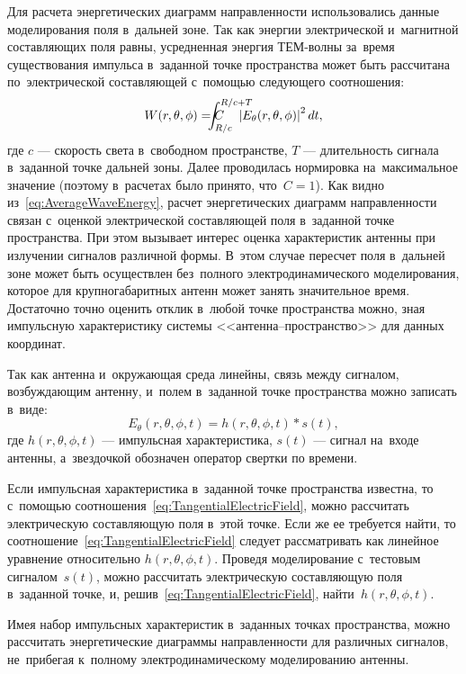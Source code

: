 Для расчета энергетических диаграмм направленности использовались данные
моделирования поля в~дальней зоне. Так как энергии электрической и~магнитной
составляющих поля равны, усредненная энергия ТЕМ-волны за~время существования
импульса в~заданной точке пространства может быть рассчитана по~электрической
составляющей с~помощью следующего соотношения:
\begin{equation}
    \label{eq:AverageWaveEnergy}
    W(r,\theta,\phi) = C\hanglimitsoperator{\int}{R/c+T}{R/c}
    \left| E_\theta(r,\theta,\phi) \right|^2 dt,
\end{equation}
где $c$ --- скорость света в~свободном пространстве, $T$ --- длительность
сигнала в~заданной точке дальней зоны. Далее проводилась нормировка на~максимальное значение
(поэтому в~расчетах было принято, что~$C=1$). Как видно
из~\eqref{eq:AverageWaveEnergy}, расчет энергетических диаграмм направленности
связан с~оценкой электрической составляющей поля в~заданной точке пространства.
При этом вызывает интерес оценка характеристик антенны при излучении сигналов
различной формы. В~этом случае пересчет поля в~дальней зоне может быть
осуществлен без~полного электродинамического моделирования, которое для
крупногабаритных антенн может занять значительное время. Достаточно точно
оценить отклик в~любой точке пространства можно, зная импульсную характеристику
системы <<антенна–пространство>> для данных координат.

Так как антенна и~окружающая среда линейны, связь между сигналом, возбуждающим
антенну, и~полем в~заданной точке пространства можно записать в~виде:
\begin{equation}
    \label{eq:TangentialElectricField}
	E_\theta(r,\theta,\phi,t) = h(r,\theta,\phi,t) * s(t),
\end{equation}
где $h(r,\theta,\phi,t)$ --- импульсная характеристика, $s(t)$ --- сигнал на~входе
антенны, а~звездочкой обозначен оператор свертки по времени.

Если импульсная характеристика в~заданной точке пространства известна, то
с~помощью соотношения~\eqref{eq:TangentialElectricField}, можно рассчитать
электрическую составляющую поля в~этой точке. Если же ее требуется найти, то
соотношение~\eqref{eq:TangentialElectricField} следует рассматривать как
линейное уравнение относительно $h(r,\theta,\phi,t)$. Проведя моделирование
с~тестовым сигналом~$s(t)$, можно рассчитать электрическую составляющую поля
в~заданной точке, и, решив~\eqref{eq:TangentialElectricField},
найти~$h(r,\theta,\phi,t)$.

Имея набор импульсных характеристик в~заданных точках пространства, можно
рассчитать энергетические диаграммы направленности для различных сигналов,
не~прибегая к~полному электродинамическому моделированию антенны.
